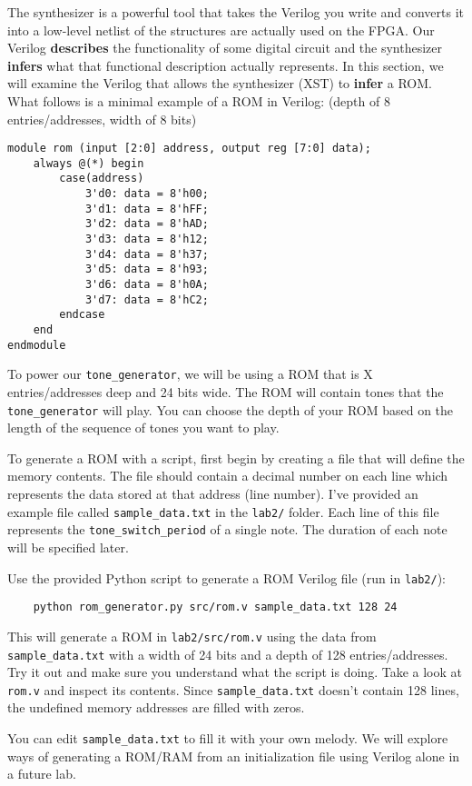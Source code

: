 \documentclass[11pt]{article}
\begin{document}
The synthesizer is a powerful tool that takes the Verilog you write and converts it into a low-level netlist of the structures are actually used on the FPGA. Our Verilog \textbf{describes} the functionality of some digital circuit and the synthesizer \textbf{infers} what that functional description actually represents. In this section, we will examine the Verilog that allows the synthesizer (XST) to \textbf{infer} a ROM. What follows is a minimal example of a ROM in Verilog: (depth of 8 entries/addresses, width of 8 bits)

\begin{verbatim}
module rom (input [2:0] address, output reg [7:0] data);
	always @(*) begin
		case(address)
			3'd0: data = 8'h00;
			3'd1: data = 8'hFF;
			3'd2: data = 8'hAD;
			3'd3: data = 8'h12;
			3'd4: data = 8'h37;
			3'd5: data = 8'h93;
			3'd6: data = 8'h0A;
			3'd7: data = 8'hC2;
		endcase
	end
endmodule
\end{verbatim}

To power our \verb|tone_generator|, we will be using a ROM that is X entries/addresses deep and 24 bits wide. The ROM will contain tones that the \verb|tone_generator| will play. You can choose the depth of your ROM based on the length of the sequence of tones you want to play.

To generate a ROM with a script, first begin by creating a file that will define the memory contents. The file should contain a decimal number on each line which represents the data stored at that address (line number). I've provided an example file called \verb|sample_data.txt| in the \verb|lab2/| folder. Each line of this file represents the \verb|tone_switch_period| of a single note. The duration of each note will be specified later.

Use the provided Python script to generate a ROM Verilog file (run in \verb|lab2/|):

\begin{verbatim}
	python rom_generator.py src/rom.v sample_data.txt 128 24
\end{verbatim}

This will generate a ROM in \verb|lab2/src/rom.v| using the data from \verb|sample_data.txt| with a width of 24 bits and a depth of 128 entries/addresses. Try it out and make sure you understand what the script is doing. Take a look at \verb|rom.v| and inspect its contents. Since \verb|sample_data.txt| doesn't contain 128 lines, the undefined memory addresses are filled with zeros.

You can edit \verb|sample_data.txt| to fill it with your own melody. We will explore ways of generating a ROM/RAM from an initialization file using Verilog alone in a future lab.\\
\end{document}
